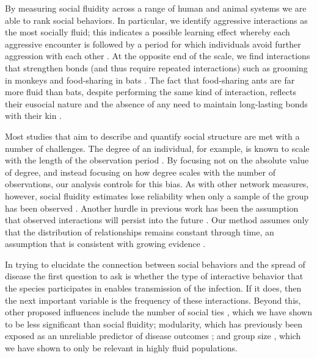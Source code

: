 \documentclass[twocolumn,8pt]{article}
\begin{document}
By measuring social fluidity across a range of human and animal systems we are able to rank social behaviors. In particular, we identify aggressive interactions as the most socially fluid; this indicates a possible learning effect whereby each aggressive encounter is followed by a period for which individuals avoid further aggression with each other \cite{parker1974assessment}. At the opposite end of the scale, we find interactions that strengthen bonds (and thus require repeated interactions) such as grooming in monkeys \cite{seyfarth1984grooming} and food-sharing in bats \cite{Carter20122573}. The fact that food-sharing ants are far more fluid than bats, despite performing the same kind of interaction, reflects their eusocial nature and the absence of any need to maintain long-lasting bonds with their kin \cite{holldobler2009superorganism}.

Most studies that aim to describe and quantify social structure are met with a number of challenges. The degree of an individual, for example, is known to scale with the length of the observation period \cite{perra2012activity}. By focusing not on the absolute value of degree, and instead focusing on how degree scales with the number of observations, our analysis controls for this bias. As with other network measures, however, social fluidity estimates lose reliability when only a sample of the group has been observed \cite{SILK20151}. Another hurdle in previous work has been the assumption that observed interactions will persist into the future \cite{perreault2010note}. Our method assumes only that the distribution of relationships remains constant through time, an assumption that is consistent with growing evidence \cite{miritello2013limited,10.1371/journal.pone.0173110}.

In trying to elucidate the connection between social behaviors and the spread of disease the first question to ask is whether the type of interactive behavior that the species participates in enables transmission of the infection. If it does, then the next important variable is the frequency of these interactions. Beyond this, other proposed influences include the number of social ties \cite{Craft20140107}, which we have shown to be less significant than social fluidity; modularity, which has previously been exposed as an unreliable predictor of disease outcomes \cite{sah2017unraveling}; and group size \cite{rifkin2012animals}, which we have shown to only be relevant in highly fluid populations. 
\end{document}

